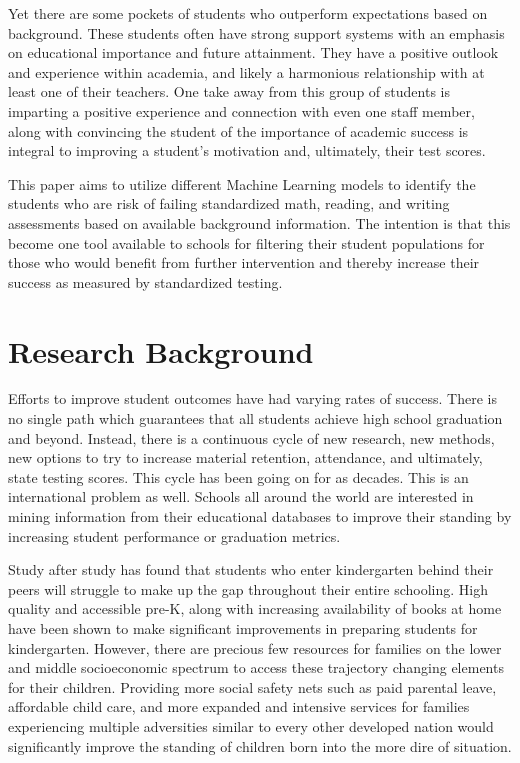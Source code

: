\documentclass[doc]{apa6} %
\begin{document}
Yet there are some pockets of students who outperform expectations based on background. \cite{YanGaiLowSEG} These students often have strong support systems with an emphasis on educational importance and future attainment. They have a positive outlook and experience within academia, and likely a harmonious relationship with at least one of their teachers. One take away from this group of students is imparting a positive experience and connection with even one staff member, along with convincing the student of the importance of academic success is integral to improving a student's motivation and, ultimately, their test scores.

This paper aims to utilize different Machine Learning models to identify the students who are risk of failing standardized math, reading, and writing assessments based on available background information.  The intention is that this become one tool available to schools for filtering their student populations for those who would benefit from further intervention and thereby increase their success as measured by standardized testing.

\section{Research Background}
Efforts to improve student outcomes have had varying rates of success. There is no single path which guarantees that all students achieve high school graduation and beyond.  Instead, there is a continuous cycle of new research, new methods, new options to try to increase material retention, attendance, and ultimately, state testing scores. This cycle has been going on for as decades. \cite{AustraliaSES} This is an international problem as well. Schools all around the world are interested in mining information from their educational databases to improve their standing by increasing student performance or graduation metrics. \cite{Malaysia} 

Study after study has found that students who enter kindergarten behind their peers will struggle to make up the gap throughout their entire schooling. \cite{EdInequities} \cite{sesbehind1} \cite{sesbehind2} \cite{sesbehind3}  High quality and accessible pre-K, along with increasing availability of books at home have been shown to make significant improvements in preparing students for kindergarten. \cite{earlyengageML} However, there are precious few resources for families on the lower and middle socioeconomic spectrum to access these trajectory changing elements for their children. \cite{cradleK} Providing more social safety nets such as paid parental leave, affordable child care, and more expanded and intensive services for families experiencing multiple adversities similar to every other developed nation would significantly improve the standing of children born into the more dire of situation. \cite{duncan2013long} \cite{duncan2012importance}
\end{document}
